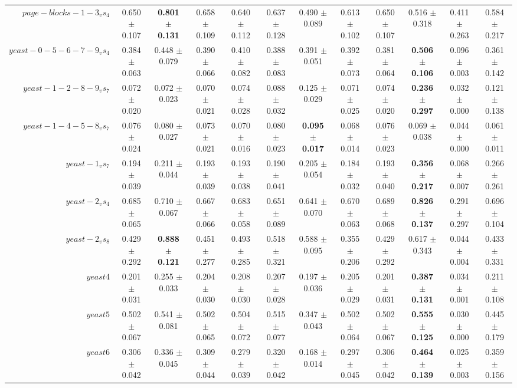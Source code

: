 \begin{table}[!ht]
{\begin{tabular}{r c c c c c c c c c c c}
$page-blocks-1-3_vs_4$ & 0.650 $\pm$ 0.107 & \textbf{0.801 $\pm$ 0.131} & 0.658 $\pm$ 0.109 & 0.640 $\pm$ 0.112 & 0.637 $\pm$ 0.128 & 0.490 $\pm$ 0.089 & 0.613 $\pm$ 0.102 & 0.650 $\pm$ 0.107 & 0.516 $\pm$ 0.318 & 0.411 $\pm$ 0.263 & 0.584 $\pm$ 0.217 \\
$yeast-0-5-6-7-9_vs_4$ & 0.384 $\pm$ 0.063 & 0.448 $\pm$ 0.079 & 0.390 $\pm$ 0.066 & 0.410 $\pm$ 0.082 & 0.388 $\pm$ 0.083 & 0.391 $\pm$ 0.051 & 0.392 $\pm$ 0.073 & 0.381 $\pm$ 0.064 & \textbf{0.506 $\pm$ 0.106} & 0.096 $\pm$ 0.003 & 0.361 $\pm$ 0.142 \\
$yeast-1-2-8-9_vs_7$ & 0.072 $\pm$ 0.020 & 0.072 $\pm$ 0.023 & 0.070 $\pm$ 0.021 & 0.074 $\pm$ 0.028 & 0.088 $\pm$ 0.032 & 0.125 $\pm$ 0.029 & 0.071 $\pm$ 0.025 & 0.074 $\pm$ 0.020 & \textbf{0.236 $\pm$ 0.297} & 0.032 $\pm$ 0.000 & 0.121 $\pm$ 0.138 \\
$yeast-1-4-5-8_vs_7$ & 0.076 $\pm$ 0.024 & 0.080 $\pm$ 0.027 & 0.073 $\pm$ 0.021 & 0.070 $\pm$ 0.016 & 0.080 $\pm$ 0.023 & \textbf{0.095 $\pm$ 0.017} & 0.068 $\pm$ 0.014 & 0.076 $\pm$ 0.023 & 0.069 $\pm$ 0.038 & 0.044 $\pm$ 0.000 & 0.061 $\pm$ 0.011 \\
$yeast-1_vs_7$ & 0.194 $\pm$ 0.039 & 0.211 $\pm$ 0.044 & 0.193 $\pm$ 0.039 & 0.193 $\pm$ 0.038 & 0.190 $\pm$ 0.041 & 0.205 $\pm$ 0.054 & 0.184 $\pm$ 0.032 & 0.193 $\pm$ 0.040 & \textbf{0.356 $\pm$ 0.217} & 0.068 $\pm$ 0.007 & 0.266 $\pm$ 0.261 \\
$yeast-2_vs_4$ & 0.685 $\pm$ 0.065 & 0.710 $\pm$ 0.067 & 0.667 $\pm$ 0.066 & 0.683 $\pm$ 0.058 & 0.651 $\pm$ 0.089 & 0.641 $\pm$ 0.070 & 0.670 $\pm$ 0.063 & 0.689 $\pm$ 0.068 & \textbf{0.826 $\pm$ 0.137} & 0.291 $\pm$ 0.297 & 0.696 $\pm$ 0.104 \\
$yeast-2_vs_8$ & 0.429 $\pm$ 0.292 & \textbf{0.888 $\pm$ 0.121} & 0.451 $\pm$ 0.277 & 0.493 $\pm$ 0.285 & 0.518 $\pm$ 0.321 & 0.588 $\pm$ 0.095 & 0.355 $\pm$ 0.206 & 0.429 $\pm$ 0.292 & 0.617 $\pm$ 0.343 & 0.044 $\pm$ 0.004 & 0.433 $\pm$ 0.331 \\
$yeast4$ & 0.201 $\pm$ 0.031 & 0.255 $\pm$ 0.033 & 0.204 $\pm$ 0.030 & 0.208 $\pm$ 0.030 & 0.207 $\pm$ 0.028 & 0.197 $\pm$ 0.036 & 0.205 $\pm$ 0.029 & 0.201 $\pm$ 0.031 & \textbf{0.387 $\pm$ 0.131} & 0.034 $\pm$ 0.001 & 0.211 $\pm$ 0.108 \\
$yeast5$ & 0.502 $\pm$ 0.067 & 0.541 $\pm$ 0.081 & 0.502 $\pm$ 0.065 & 0.504 $\pm$ 0.072 & 0.515 $\pm$ 0.077 & 0.347 $\pm$ 0.043 & 0.502 $\pm$ 0.064 & 0.502 $\pm$ 0.067 & \textbf{0.555 $\pm$ 0.125} & 0.030 $\pm$ 0.000 & 0.445 $\pm$ 0.179 \\
$yeast6$ & 0.306 $\pm$ 0.042 & 0.336 $\pm$ 0.045 & 0.309 $\pm$ 0.044 & 0.279 $\pm$ 0.039 & 0.320 $\pm$ 0.042 & 0.168 $\pm$ 0.014 & 0.297 $\pm$ 0.045 & 0.306 $\pm$ 0.042 & \textbf{0.464 $\pm$ 0.139} & 0.025 $\pm$ 0.003 & 0.359 $\pm$ 0.156 \\

\end{tabular}}
\end{table}
